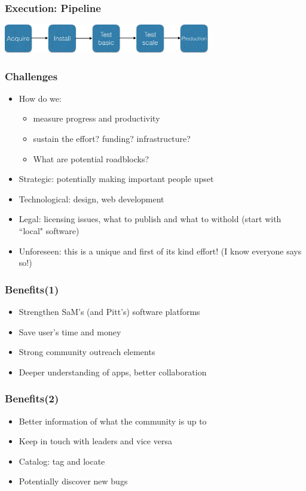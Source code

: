 \documentclass[hyperref={pdfpagelabels=false},12pt]{beamer}
\begin{document}
\begin{frame}
\frametitle{Execution: Pipeline}
\includegraphics[width=9cm]{workflow}
\end{frame}

\begin{frame}
\frametitle{Challenges}
\begin{itemize}
\itemsep1em
\item
 How do we:
\begin{itemize}
 \item
 measure progress and productivity
 \item
 sustain the effort? funding? infrastructure?
 \item
 What are potential roadblocks?
\end{itemize}
\item 
Strategic: potentially making important people upset
\item
Technological: design, web development
\item
Legal: licensing issues, what to publish and what to withold (start with ``local" software)
\item
Unforeseen: this is a unique and first of its kind effort! (I know everyone says so!)
\end{itemize}
\end{frame}

\begin{frame}
\frametitle{Benefits(1)}
\begin{itemize}
\itemsep1em
\item Strengthen SaM's (and Pitt's) software platforms
\item
Save user's time and money
\item
Strong community outreach elements
\item
Deeper understanding of apps, better collaboration
\end{itemize}
\end{frame}

\begin{frame}
\frametitle{Benefits(2)}
\begin{itemize}
\itemsep1em
\item 
Better information of what the community is up to
\item
Keep in touch with leaders and vice versa
\item
Catalog: tag and locate
\item
Potentially discover new bugs
\end{itemize}
\end{frame}
\end{document}
